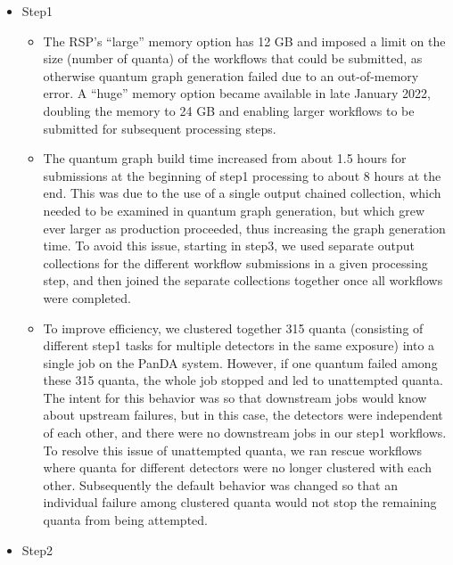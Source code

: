 \begin{itemize}

\item Step1
\begin{itemize}

  \item
  The RSP’s ``large'' memory option has 12 GB and imposed a limit on the size (number of quanta) of the workflows that could be submitted, as otherwise quantum graph generation failed due to an out-of-memory error.
  A ``huge'' memory option became available in late January 2022, doubling the memory to 24 GB and enabling larger workflows to be submitted for subsequent processing steps.

  \item
  The quantum graph build time increased from about 1.5 hours for submissions at the beginning of step1 processing to about 8 hours at the end.
  This was due to the use of a single output chained collection, which needed to be examined in quantum graph generation, but which grew ever larger as production proceeded, thus increasing the graph generation time.
  To avoid this issue, starting in step3, we used separate output collections for the different workflow submissions in a given processing step, and then joined the separate collections together once all workflows were completed.

  \item
  To improve efficiency, we clustered together 315 quanta (consisting of different step1 tasks for multiple detectors in the same exposure) into a single job on the PanDA system.
  However, if one quantum failed among these 315 quanta, the whole job stopped and led to unattempted quanta.
  The intent for this behavior was so that downstream jobs would know about upstream failures, but in this case, the detectors were independent of each other, and there were no downstream jobs in our step1 workflows.
  To resolve this issue of unattempted quanta, we ran rescue workflows where quanta for different detectors were no longer clustered with each other.
  Subsequently the default behavior was changed so that an individual failure among clustered quanta would not stop the remaining quanta from being attempted.

\end{itemize} %

\item Step2
\begin{itemize}


\end{itemize}
\end{itemize}
